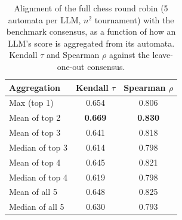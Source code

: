 \begin{table}[t]
\centering
\caption{Alignment of the full chess round robin (5 automata per LLM, $n^2$ tournament) with the benchmark consensus, as a function of how an LLM's score is aggregated from its automata. Kendall $\tau$ and Spearman $\rho$ against the leave-one-out consensus.}
\label{tab:chess_aggregation}
\begin{tabular}{lcc}
\toprule
Aggregation & Kendall $\tau$ & Spearman $\rho$ \\
\midrule
Max (top 1) & 0.654 & 0.806 \\
Mean of top 2 & \textbf{0.669} & \textbf{0.830} \\
Mean of top 3 & 0.641 & 0.818 \\
Median of top 3 & 0.614 & 0.798 \\
Mean of top 4 & 0.645 & 0.821 \\
Median of top 4 & 0.619 & 0.798 \\
Mean of all 5 & 0.648 & 0.825 \\
Median of all 5 & 0.630 & 0.793 \\
\bottomrule
\end{tabular}
\end{table}
